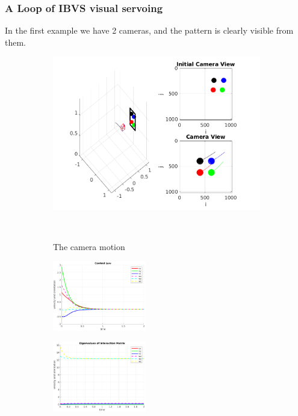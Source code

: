 \documentclass[a4paper,12pt]{article}
\begin{document}
\subsubsection{A Loop of IBVS visual servoing}
In the first example we have 2 cameras, and the pattern is clearly visible from them.
\begin{figure}[t!]
		 \begin{subfigure}[b]{\textwidth}         
         	\centering
	         \includegraphics[width=12cm]{../results/Demo1-simulation.png}
    	     \caption{The camera motion}
    	     \vspace~
		 \end{subfigure}
         \begin{subfigure}[b]{0.32\textwidth}
        	\centering
	        \includegraphics[height=1.2in]{../results/Demo1-control-law.png}
		 \end{subfigure}
         \begin{subfigure}[b]{0.2\textwidth}
        	\centering
	        \includegraphics[height=1.2in]{../results/Demo1-eignen.png}

\end{subfigure}
\end{figure}
\end{document}
